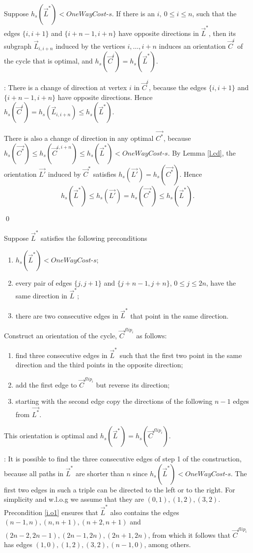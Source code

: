 \begin{lemma}\label{l.subo}
	Suppose $h_s(\vec{L}^*) < \textit{OneWayCost-s}$.
	If there is an $i,\ 0\leq i \leq n$, such that the edges $\{i,i+1\}$ and $\{i+n-1,i+n\}$ 
	have opposite directions in $\vec{L}^*$,
	then its subgraph $\vec{L}_{i,i+n}$ induced by the vertices $i,\ldots,i+n$ induces
	an orientation $\vec{C}^{i}$ of the cycle that is optimal, and $h_s(\vec{C}^{i})= h_s(\vec{L}^*)$.
\end{lemma}
:
There is a change of direction at vertex $i$ in $\vec{C}^{i}$,
because the edges $\{i,i+1\}$ and $\{i+n-1,i+n\}$ have opposite directions.
Hence $h_s(\vec{C}^{i}) =h_s(\vec{L}_{i,i+n})\leq h_s(\vec{L}^*)$.

There is also a change of direction in any optimal $\vec{C^*}$, because 
$h_s(\vec{C^*}) \leq h_s(\vec{C}^{i, i+n})  \leq h_s(\vec{L}^*)<\textit{OneWayCost-s}$. 
By Lemma \ref{l.cd},  the orientation $\vec{L'}$ induced by $\vec{C}^*$
satisfies $h_s(\vec{L'})= h_s(\vec{C^*})$. Hence
$$h_s(\vec{L}^*)\leq h_s(\vec{L'})= h_s(\vec{C^*})\leq h_s(\vec{L}^*) .$$

\qed

\begin{lemma}\label{l.last}
	Suppose $\vec{L}^*$ satisfies the following preconditions 
	\begin{enumerate}
		\item $h_s(\vec{L}^*) < \textit{OneWayCost-s}$;
		\item \label{i.o1}every pair of edges $\{j,j+1\}$ and $\{j+n-1,j+n\}$, $0\leq j \leq 2n$,
		 have the same direction in $\vec{L}^*$;
		\item there are two consecutive edges in  $\vec{L}^*$ that point in the same direction.
	\end{enumerate} 
Construct an orientation of the cycle, $\vec{C}^{flip_i}$ as follows:
\begin{enumerate}
	\item find three consecutive edges in $\vec{L}^*$ such that the first two point in the same direction and the third points in the opposite direction;
	\item add the first edge to $\vec{C}^{flip_i}$ but reverse its direction;
	\item starting with the second edge copy the directions of the following $n-1$ edges 
	from $\vec{L^*}$.
\end{enumerate}
This orientation is optimal and $h_s(\vec{L}^*) = h_s(\vec{C}^{flip_i})$.
	\end{lemma}
: 
It is possible to find the three consecutive edges of step 1 of the construction, because 
all paths in $\vec{L}^*$ are shorter than $n$ since $h_s(\vec{L}^*) < \textit{OneWayCost-s}$.
The first two edges in such a triple can be directed to the left or to the right.
For simplicity and w.l.o.g we assume that they are $(0,1), (1,2),(3,2)$. Precondition
	 \ref{i.o1} ensures that $\vec{L}^*$ also contains the edges $(n-1,n),(n,n+1),(n+2,n+1)$ and $(2n-2,2n-1),(2n-1,2n), (2n+1,2n) $, from which it follows that $\vec{C}^{flip_i}$ has edges 
	 $(1,0), (1,2),(3,2),(n-1,0)$, among others.
	

